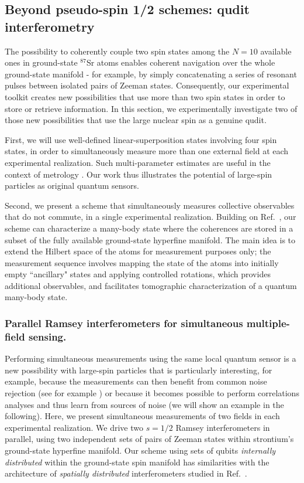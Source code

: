 \subsection{Beyond pseudo-spin 1/2 schemes: qudit interferometry}
\label{Sec:BeyondPseduoSpin}

The possibility to coherently couple two spin states among the $N=10$ available ones in ground-state $^{87}$Sr atoms enables coherent navigation over the whole ground-state manifold - for example, by simply concatenating a series of resonant pulses between isolated pairs of Zeeman states. Consequently, our experimental toolkit creates new possibilities that use more than two spin states in order to store or retrieve information. In this section, we experimentally investigate two of those new possibilities that use the large nuclear spin as a genuine qudit.

First, we will use well-defined linear-superposition states involving four spin states, in order to simultaneously measure more than one external field at each experimental realization. Such multi-parameter estimates are useful in the context of metrology \cite{Baamara2023qem}. Our work thus illustrates the potential of large-spin particles as original quantum sensors.

Second, we present a scheme that simultaneously measures collective observables that do not commute, in a single experimental realization. Building on Ref.~\cite{Kunkel2019}, our scheme can characterize a many-body state where the coherences are stored in a subset of the fully available ground-state hyperfine manifold. The main idea is to extend the Hilbert space of the atoms for measurement purposes only; the measurement sequence involves mapping the state of the atoms into initially empty ``ancillary" states and applying controlled rotations, which provides additional observables, and facilitates tomographic characterization of a quantum many-body state.

\subsubsection{Parallel Ramsey interferometers for simultaneous multiple-field sensing.}
\label{SubSec:ParallelRamsey}


Performing simultaneous measurements using the same local quantum sensor is a new possibility with large-spin particles that is particularly interesting, for example, because the measurements can then benefit from common noise rejection (see for example \cite{Campbell2017FermiDegClock, Savoie2018InterleavedInterf, Schioppo2016DualYbClock, Cheiney2018ContinuousAccelero}) or because it becomes possible to perform correlations analyses and thus learn from sources of noise (we will show an example in the following). Here, we present simultaneous measurements of two fields in each experimental realization. We drive two $s=1/2$ Ramsey interferometers in parallel, using two independent sets of pairs of Zeeman states within strontium's ground-state hyperfine manifold. Our scheme using sets of qubits \textit{internally distributed} within the ground-state spin manifold has similarities with the architecture of \textit{spatially distributed} interferometers studied in Ref.~\cite{Gessner2020msf}.

